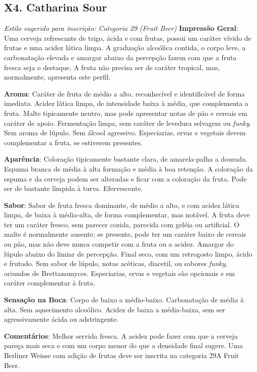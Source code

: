 \subsection*{X4. Catharina Sour}

\textit{Estilo sugerido para inscrição: Categoria 29 (Fruit Beer)}
\textbf{Impressão Geral}: Uma cerveja refrescante de trigo, ácida e com frutas, possui um caráter vívido de frutas e uma acidez lática limpa. A graduação alcoólica contida, o corpo leve, a carbonatação elevada e amargor abaixo da percepção fazem com que a fruta fresca seja o destaque. A fruta não precisa ser de caráter tropical, mas, normalmente, apresenta este perfil.

\textbf{Aroma}: Caráter de fruta de médio a alto, reconhecível e identificável de forma imediata. Acidez lática limpa, de intensidade baixa à média, que complementa a fruta. Malte tipicamente neutro, mas pode apresentar notas de pão e cereais em caráter de apoio. Fermentação limpa, sem caráter de levedura selvagem ou \textit{funky}. Sem aroma de lúpulo. Sem álcool agressivo. Especiarias, ervas e vegetais devem complementar a fruta, se estiverem presentes.

\textbf{Aparência}: Coloração tipicamente bastante clara, de amarela-palha a dourada. Espuma branca de média à alta formação e média à boa retenção. A coloração da espuma e da cerveja podem ser alteradas e ficar com a coloração da fruta. Pode ser de bastante límpida à turva. Efervescente.

\textbf{Sabor}: Sabor de fruta fresca dominante, de médio a alto, e com acidez lática limpa, de baixa à média-alta, de forma complementar, mas notável. A fruta deve ter um caráter fresco, sem parecer cozida, parecida com geléia ou artificial. O malte é normalmente ausente; se presente, pode ter um caráter baixo de cereais ou pão, mas não deve nunca competir com a fruta ou a acidez. Amargor do lúpulo abaixo do limiar de percepção. Final seco, com um retrogosto limpo, ácido e frutado. Sem sabor de lúpulo, notas acéticas, diacetil, ou sabores \textit{funky}, oriundos de Brettanomyces. Especiarias, ervas e vegetais são opcionais e em caráter complementar à fruta.

\textbf{Sensação na Boca}: Corpo de baixo a médio-baixo. Carbonatação de média à alta. Sem aquecimento alcoólico. Acidez de baixa a média-baixa, sem ser agressivamente ácida ou adstringente.

\textbf{Comentários}: Melhor servida fresca. A acidez pode fazer com que a cerveja pareça mais seca e com um corpo menor do que a densidade final sugere. Uma Berliner Weisse com adição de frutas deve ser inscrita na categoria 29A Fruit Beer.

